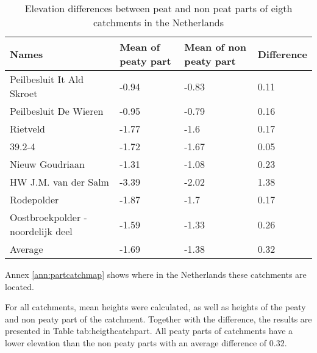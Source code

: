 \documentclass[a4paper,12pt]{scrbook}
\begin{document}
\begin{table}[htbp]
\caption{Elevation differences between peat and non peat parts of eigth catchments in the Netherlands}
\begin{center}
\begin{tabular}{|p{4cm}|p{4cm}|p{4cm}|p{4cm}|}
\hline
\textbf{Names} & \multicolumn{1}{l|}{\textbf{Mean of peaty part}} & \multicolumn{1}{l|}{\textbf{Mean of non peaty part}} & \multicolumn{1}{l|}{\textbf{Difference}} \\ \hline
Peilbesluit It Ald Skroet & -0.94 & -0.83 & 0.11 \\ \hline
Peilbesluit De Wieren & -0.95 & -0.79 & 0.16 \\ \hline
Rietveld & -1.77 & -1.6 & 0.17 \\ \hline
39.2-4 & -1.72 & -1.67 & 0.05 \\ \hline
Nieuw Goudriaan & -1.31 & -1.08 & 0.23 \\ \hline
HW J.M. van der Salm & -3.39 & -2.02 & 1.38 \\ \hline
Rodepolder & -1.87 & -1.7 & 0.17 \\ \hline
Oostbroekpolder - noordelijk deel & -1.59 & -1.33 & 0.26 \\ \hline
Average & -1.69 & -1.38 & 0.32 \\ \hline
\end{tabular}
\end{center}
\label{tab:heigthcatchpart}
\end{table}

Annex \ref{ann:partcatchmap} shows where in the Netherlands these catchments are located.


For all catchments, mean heights were calculated, as well as heights of the peaty and non peaty part of the catchment. Together with the difference, the results are presented in Table {tab:heigthcatchpart}. All peaty parts of catchments have a lower elevation than the non peaty parts with an average difference of 0.32. 


\end{document}
